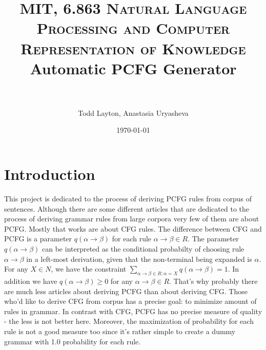 \documentclass[paper=a4, fontsize=11pt]{scrartcl} %
\title{	
\normalfont \normalsize 
\textsc{MIT, 6.863 Natural Language Processing and Computer Representation of Knowledge}
\horrule{0.5pt} \\[0.4cm] %
\huge Automatic PCFG Generator \\ %
\horrule{2pt} \\[0.5cm] %
}
\author {Todd Layton, Anastasia Uryasheva}
\date{\normalsize\today}
\numberwithin{equation}{section} %
\numberwithin{figure}{section} %
\numberwithin{table}{section} %
\begin{document}
\maketitle %


\section{Introduction}

This project is dedicated to the process of deriving PCFG rules from corpus of sentences. Although there are some different articles that are dedicated to the process of deriving grammar rules from large corpora very few of them are about PCFG. Mostly that works are about CFG rules. The difference between CFG and PCFG is a parameter \begin{math} q(\alpha \rightarrow \beta) \end{math} for each rule \begin{math} \alpha\rightarrow \beta \in R \end{math}. The parameter \begin{math} q(\alpha \rightarrow \beta) \end{math} can be interpreted as the conditional probabilty of choosing rule \begin{math} \alpha \rightarrow \beta \end{math} in a left-most derivation, given that the non-terminal being expanded is \begin{math} \alpha \end{math}. For any \begin{math} X \in N \end{math}, we have the constraint \begin{math} \sum_{\alpha\rightarrow\beta\in R:\alpha=X} q(\alpha\rightarrow\beta) = 1 \end{math}. In addition we have \begin{math} q(\alpha\rightarrow\beta) \geqslant 0 \end{math} for any \begin{math} \alpha \rightarrow \beta \in R \end{math}. 
That's why probably there are much less articles about deriving PCFG than about deriving CFG. Those who'd like to derive CFG from corpus has a precise goal: to minimize amount of rules in grammar. In contrast with CFG, PCFG has no precise measure of quality - the less is not better here. Moreover, the maximization of probability for each rule is not a good measure too since it's rather simple to create a dummy grammar with 1.0 probability for each rule. 
\end{document}
